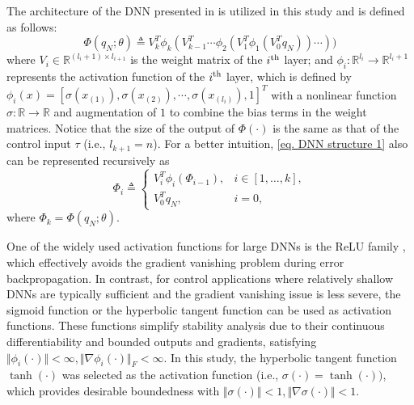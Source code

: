 \documentclass[lettersize,journal]{IEEEtran}
\begin{document}
The architecture of the DNN presented in \cite{RN16} is utilized in this study and is defined as follows:
\begin{equation}
    \Phi(q_N;\theta) \triangleq V_k^T  \phi_{k}(V_{k-1}^T   \cdots \phi_2(V_1^T   \phi_1(V_0^T   q_N))\cdots ))
    \label{eq. DNN structure 1}
\end{equation}
where $V_i\in\mathbb{R}^{(l_i+1)\times l_{i+1}}$ is the weight matrix of the $i\textsuperscript{th}$ layer; and $\phi_i: \mathbb{R}^{l_i}\to\mathbb{R}^{l_i+1}$ represents the activation function of the $i\textsuperscript{th}$ layer, which is defined by $\phi_i(x)=[\sigma(x_{(1)}),\sigma(x_{(2)}),\cdots, \sigma(x_{(l_{i})}), 1]^T$ with a nonlinear function $\sigma: \mathbb{R}\to\mathbb{R}$ and augmentation of $1$ to combine the bias terms in the weight matrices. Notice that the size of the output of $\Phi(\cdot)$ is the same as that of the control input $\tau$ (i.e., $l_{k+1}=n$).
For a better intuition, \eqref{eq. DNN structure 1} also can be represented recursively as 
\begin{equation*}
    \Phi_i \triangleq
    \begin{cases}
        V_i^T  \phi_i(\Phi_{i-1}), &i\in[1,\dots,k],\\
        V_0^T  q_N,&i=0,
    \end{cases}
    \label{eq. DNN structure 2}
\end{equation*}
where $\Phi_k = \Phi(q_N;\theta)$.

One of the widely used activation functions for large DNNs is the ReLU family \cite{RN27}, which effectively avoids the gradient vanishing problem during error backpropagation. In contrast, for control applications where relatively shallow DNNs are typically sufficient and the gradient vanishing issue is less severe, the sigmoid function or the hyperbolic tangent function can be used as activation functions. These functions simplify stability analysis due to their continuous differentiability and bounded outputs and gradients, satisfying $\Vert \phi_i(\cdot)\Vert < \infty, \Vert \nabla\phi_i(\cdot)\Vert_F < \infty$.
In this study, the hyperbolic tangent function $\tanh(\cdot)$ was selected as the activation function (i.e., $\sigma(\cdot) = \tanh(\cdot))$, which provides desirable boundedness with $\Vert\sigma(\cdot)\Vert<1, \Vert\nabla\sigma(\cdot)\Vert< 1$.
\end{document}
